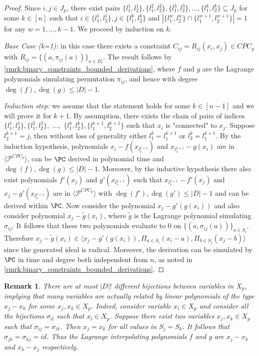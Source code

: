 \documentclass[11pt]{article}
\newtheorem{remark}[theorem]{Remark}
\begin{document}
\begin{proof}
    Since $i,j \in J_p$, there exist pairs $\{ l_1^1, l_2^1 \}, \{ l_1^2, l_2^2 \}, \{l_1^3, l_2^3\}, \ldots, \{l_1^k, l_2^k\} \subseteq J_p$ for some $k \in [n]$ such that $i \in \{ l_1^1, l_2^1 \}, j \in \{l_1^k, l_2^k\}$ and $|\{l_1^w, l_2^w\} \cap \{l_1^{w+1}, l_2^{w+1}\}| = 1$ for any $w = 1, \ldots, k-1$. We proceed by induction on $k$.

    \textit{Base Case (k=1):} in this case there exists a constraint $C_{ij} = R_{ij}(x_i,x_j) \in CPC_p$ with $R_{ij} = \{(a,\pi_{ij}(a))\}_{a \in D_i}$. The result follows by \cref{rmrk:binary_constraints_bounded_derivations}, where $f$ and $g$ are the Lagrange polynomials simulating permutation $\pi_{ij}$, and hence with degree $\deg(f), \deg(g) \leq |D| - 1$.

    \textit{Induction step:} we assume that the statement holds for some $k \in [n-1]$ and we will prove it for $k+1$. By assumption, there exists the chain of pairs of indices $\{ l_1^1, l_2^1 \}, \{ l_1^2, l_2^2 \},$ $ \ldots,$  $ \{l_1^k, l_2^k\}, \{l_1^{k+1}, l_2^{k+1}\}$ such that $x_i$ is "connected" to $x_j$. Suppose $l_2^{k+1} = j$, then without loss of generality either $l_1^k = l_1^{k+1}$ or $l_2^k = l_1^{k+1}$. By the induction hypothesis, polynomials $x_i - f(x_{l_1^{k+1}})$ and $x_{l_1^{k+1}} - g(x_i)$ are in $\langle \mathcal{P}^{CPC_p} \rangle$, can be $\PC$ derived in polynomial time and $\deg(f), \deg(g) \leq |D| - 1$. Moreover, by the inductive hypothesis there also exist polynomials $f'(x_j)$ and $g'(x_{l_1^{k+1}})$ such that $x_{l_1^{k+1}} - f'(x_j)$ and $x_j - g'(x_{l_1^{k+1}})$ are in $\langle \mathcal{P}^{CPC_p} \rangle$ with $\deg(f'),\deg(g') \leq |D| - 1$ and can be derived within $\PC$. Now consider the polynomial $x_j - g'(g(x_i))$ and also consider polynomial $x_j - \tilde{g}(x_i)$, where $\tilde{g}$ is the Lagrange polynomial simulating $\sigma_{ij}$. It follows that these two polynomials evaluate to 0 on $\{(a,\sigma_{ij}(a))\}_{a \in S_i}$. Therefore $x_j - \tilde{g}(x_i) \in \langle x_j - g'(g(x_i)), \Pi_{a \in S_i}(x_i - a), \Pi_{b \in S_j} (x_j - b) \rangle $ since the generated ideal is radical. Moreover, the derivation can be simulated by $\PC$ in time and degree both independent from $n$, as noted in \cref{rmrk:binary_constraints_bounded_derivations}.
\end{proof}


\begin{remark}
    There are at most $|D|!$ different bijections between variables in $X_p$, implying that many variables are actually related by linear polynomials of the type $x_j - x_k$ for some $x_j, x_k \in X_p$. Indeed, consider variable $x_i \in X_p$ and consider all the bijections $\sigma_{il}$ such that $x_l \in X_p$. Suppose there exist two variables $x_j, x_k \in X_p$ such that $\sigma_{ij} = \sigma_{ik}$. Then $x_j = x_k$ for all values in $S_j = S_k$. It follows that $\sigma_{jk} = \sigma_{kj} = id$. Thus the Lagrange interpolating polynomials $f$ and $g$ are $x_j - x_k$ and $x_k - x_j$ respectively.
\end{remark}
\end{document}
